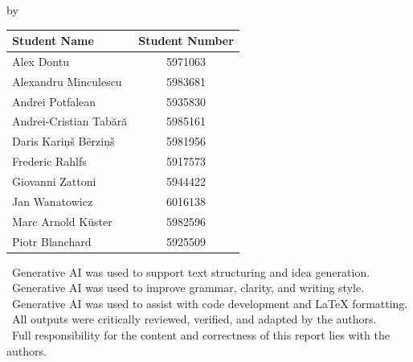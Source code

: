 \begin{titlepage}

\begin{center}

{\makeatletter
\largetitlestyle\fontsize{45}{45}\selectfont\@title
\makeatother}

{\makeatletter
\ifdefvoid{\@subtitle}{}{\bigskip\titlestyle\fontsize{20}{20}\selectfont\@subtitle}
\makeatother}

\bigskip
\bigskip

by

\bigskip
\bigskip

{\makeatletter
\largetitlestyle\fontsize{25}{25}\selectfont\@author
\makeatother}

\bigskip
\bigskip

\setlength\extrarowheight{2pt}
\begin{tabular}{lc}
    Student Name & Student Number \\\midrule
    Alex Dontu & 5971063\\
    Alexandru Minculescu & 5983681\\
    Andrei Potfalean & 5935830\\
    Andrei-Cristian Tab\u{a}r\u{a} & 5985161\\
    Daris Kari\c{n}\v{s} B\={e}rzi\c{n}\v{s} & 5981956\\
    Frederic Rahlfs & 5917573\\
    Giovanni Zattoni & 5944422\\
    Jan Wanatowicz & 6016138\\
    Marc Arnold K\"{u}ster & 5982596\\
    Piotr Blanchard & 5925509\\    
\end{tabular}


\vspace{4.5em}



\begin{center}
\begin{minipage}{1.0\textwidth}
\centering
\textbullet\ Generative AI was used to support text structuring and idea generation. \\[0.3em]
\textbullet\ Generative AI was used to improve grammar, clarity, and writing style. \\[0.3em]
\textbullet\ Generative AI was used to assist with code development and LaTeX formatting. \\[0.3em]
\textbullet\ All outputs were critically reviewed, verified, and adapted by the authors. \\[0.3em]
\textbullet\ Full responsibility for the content and correctness of this report lies with the authors.
\end{minipage}
\end{center}





\end{center}
\end{titlepage}
